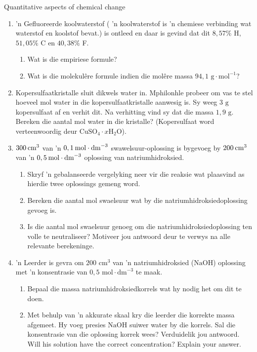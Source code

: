 \begin{eocexercises}{Quantitative aspects of chemical change}
\begin{enumerate}[noitemsep, label=\textbf{\arabic*}. ]
\item   'n Gefluoreerde koolwaterstof ( 'n koolwaterstof is  'n chemiese verbinding wat waterstof en koolstof bevat.) is ontleed en daar is gevind dat dit $8,57\%$ H, $51,05\%$ C en $40,38\%$ F.
 \begin{enumerate}[noitemsep, label=\textbf{\alph*}. ] 
 \item Wat is die empiriese formule?
 \item Wat is die molekulêre formule indien die mol\^{e}re massa $94,1\text{ g}\cdot {\text{mol}}^{-1}$?
 \end{enumerate}
\item Kopersulfaatkristalle sluit dikwels water in. Mphilonhle probeer om vas te stel hoeveel mol water in die kopersulfaatkristalle aanwesig is. Sy weeg $3 \text{ g}$ kopersulfaat af en verhit dit. Na verhitting vind sy dat die massa $1,9 \text{ g}$. Bereken die aantal mol water in die kristalle? (Kopersulfaat word verteenwoordig deur ${\text{CuSO}}_{4}\cdot x{\text{H}}_{2}\text{O}$).        
\item $300\phantom{\rule{2pt}{0ex}}{\text{cm}}^{3}$ van  'n $0,1\phantom{\rule{2pt}{0ex}}\text{mol}\ensuremath{\cdot}{\text{dm}}^{-3}$ swawelsuur-oplossing is bygevoeg by $200\phantom{\rule{2pt}{0ex}}{\text{cm}}^{3}$ van  'n $0,5\phantom{\rule{2pt}{0ex}}\text{mol}\ensuremath{\cdot}{\text{dm}}^{-3}$ oplossing van natriumhidroksied.
 \begin{enumerate}[noitemsep, label=\textbf{\alph*}. ] 
 \item Skryf  'n gebalanseerde vergelyking neer vir die reaksie wat plaasvind as hierdie twee oplossings gemeng word.
 \item Bereken die aantal mol swaelsuur wat by die natriumhidroksiedoplossing gevoeg is.
 \item Is die aantal mol swaelsuur genoeg om die natriumhidroksiedoplossing ten volle te neutraliseer? Motiveer jou antwoord deur te verwys na alle relevante berekeninge.
 \end{enumerate}
\item  'n Leerder is gevra om $200 {\text{ cm}}^{3}$ van   'n natriumhidroksied ($\text{NaOH}$) oplossing met   'n konsentrasie van $0,5 \text{ mol} \cdot {\text{dm}}^{-3}$ te maak.
 \begin{enumerate}[noitemsep, label=\textbf{\alph*}. ] 
 \item Bepaal die massa natriumhidroksiedkorrels wat hy nodig het om dit te doen.
 \item Met behulp van  'n akkurate skaal kry die leerder die korrekte massa afgemeet. Hy voeg presies $\text{NaOH}$ suiwer water by die korrels. Sal die konsentrasie van die oplossing korrek wees? Verduidelik jou antwoord. Will his solution have the correct concentration? Explain your answer.

\end{enumerate}
\end{enumerate}
\end{eocexercises}

